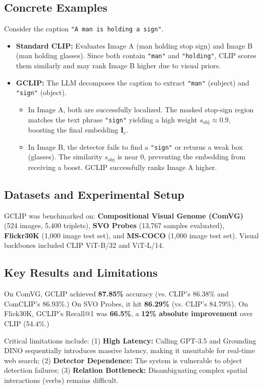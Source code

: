 \documentclass[11pt,a4paper]{article}
\begin{document}
\subsection{Concrete Examples}
Consider the caption \texttt{"A man is holding a sign"}.
\begin{itemize}
    \item \textbf{Standard CLIP:} Evaluates Image A (man holding stop sign) and Image B (man holding glasses). Since both contain \texttt{"man"} and \texttt{"holding"}, CLIP scores them similarly and may rank Image B higher due to visual priors.
    \item \textbf{GCLIP:} The LLM decomposes the caption to extract \texttt{"man"} (subject) and \texttt{"sign"} (object).
    \begin{itemize}
        \item In Image A, both are successfully localized. The masked stop-sign region matches the text phrase \texttt{"sign"} yielding a high weight $s_{\text{obj}} \approx 0.9$, boosting the final embedding $\bm{I}_c$.
        \item In Image B, the detector fails to find a \texttt{"sign"} or returns a weak box (glasses). The similarity $s_{\text{obj}}$ is near $0$, preventing the embedding from receiving a boost. GCLIP successfully ranks Image A higher.
    \end{itemize}
\end{itemize}

\subsection{Datasets and Experimental Setup}
GCLIP was benchmarked on: \textbf{Compositional Visual Genome (ComVG)} (524 images, 5,400 triplets), \textbf{SVO Probes} (13,767 samples evaluated), \textbf{Flickr30K} (1,000 image test set), and \textbf{MS-COCO} (1,000 image test set). Visual backbones included CLIP ViT-B/32 and ViT-L/14.

\subsection{Key Results and Limitations}
On ComVG, GCLIP achieved \textbf{87.85\%} accuracy (vs. CLIP's 86.38\% and ComCLIP's 86.93\%.) On SVO Probes, it hit \textbf{86.29\%} (vs. CLIP's 84.79\%). On Flick30K, GCLIP's Recall@1 was \textbf{66.5\%}, a \textbf{12\% absolute improvement} over CLIP (54.4\%.) 

Critical limitations include: (1) \textbf{High Latency:} Calling GPT-3.5 and Grounding DINO sequentially introduces massive latency, making it unsuitable for real-time web search; (2) \textbf{Detector Dependence:} The system is vulnerable to object detection failures; (3) \textbf{Relation Bottleneck:} Disambiguating complex spatial interactions (verbs) remains difficult.
\end{document}
